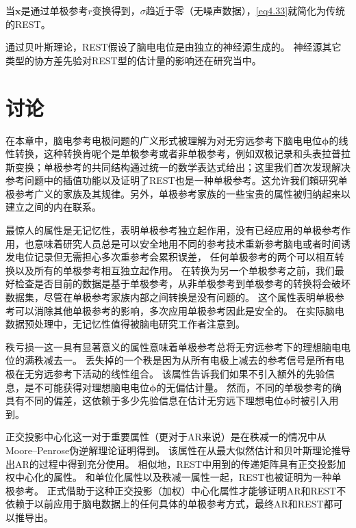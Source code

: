 当$\mathbf{x}$是通过单极参考$r$变换得到，$\sigma$趋近于零（无噪声数据），\eqref{eq4.33}就简化为传统的REST。

通过贝叶斯理论，REST假设了脑电电位是由独立的神经源生成的。 神经源其它类型的协方差先验对REST型的估计量的影响还在研究当中。 
\section{讨论}
在本章中，脑电参考电极问题的广义形式被理解为对无穷远参考下脑电电位$\mathbf{\phi}$的线性转换，这种转换肯呢个是单极参考或者非单极参考，例如双极记录和头表拉普拉斯变换；单极参考的共同结构通过统一的数学表达式给出；这里我们首次发现解决参考问题中的插值功能以及证明了REST也是一种单极参考。这允许我们賴研究单极参考广义的家族及其规律。另外，单极参考家族的一些宝贵的属性被归纳起来以建立之间的内在联系。 

最惊人的属性是无记忆性，表明单极参考独立起作用，没有已经应用的单极参考作用，也意味着研究人员总是可以安全地用不同的参考技术重新参考脑电或者时间诱发电位记录但无需担心多次重参考会累积误差， 任何单极参考的两个可以相互转换以及所有的单极参考相互独立起作用。 在转换为另一个单极参考之前，我们最好检查是否目前的数据是基于单极参考，从非单极参考到单极参考的转换将会破坏数据集，尽管在单极参考家族内部之间转换是没有问题的。 这个属性表明单极参考可以消除其他单极参考的影响，多次应用单极参考因此是安全的。 在实际脑电数据预处理中，无记忆性值得被脑电研究工作者注意到。

秩亏损一这一具有显著意义的属性意味着单极参考总将无穷远参考下的理想脑电电位的满秩减去一。 丢失掉的一个秩是因为从所有电极上减去的参考信号是所有电极在无穷远参考下活动的线性组合。 该属性告诉我们如果不引入额外的先验信息，是不可能获得对理想脑电电位$\mathbf{\phi}$的无偏估计量。 然而，不同的单极参考的确具有不同的偏差，这依赖于多少先验信息在估计无穷远下理想电位$\mathbf{\phi}$时被引入用到。

正交投影中心化这一对于重要属性（更对于AR来说）是在秩减一的情况中从Moore–Penrose伪逆解理论证明得到。 该属性在从最大似然估计和贝叶斯理论推导出AR的过程中得到充分使用。 相似地，REST中用到的传递矩阵具有正交投影加权中心化的属性。 和单位化属性以及秩减一属性一起，REST也被证明为一种单极参考。 正式借助于这种正交投影（加权）中心化属性才能够证明AR和REST不依赖于以前应用于脑电数据上的任何具体的单极参考方式，最终AR和REST都可以推导出。

